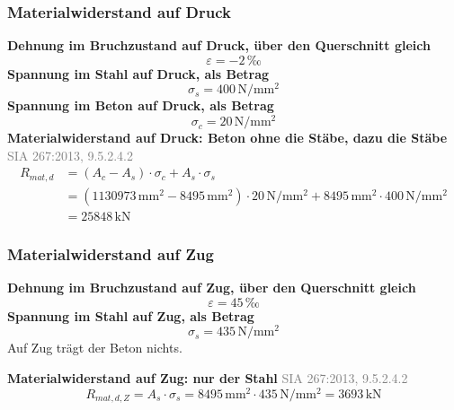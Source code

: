 \documentclass[11pt,a4paper]{article}
\newcommand{\normref}[1]{{\small\textcolor{gray}{#1}}}
\begin{document}
\subsubsection{Materialwiderstand auf Druck}
\noindent\textbf{Dehnung im Bruchzustand auf Druck, über den Querschnitt gleich}
\begin{equation*}
\varepsilon = -2\,\text{‰}
\end{equation*}
\noindent\textbf{Spannung im Stahl auf Druck, als Betrag}
\begin{equation*}
\sigma_s = 400\,\mathrm{N}/\mathrm{mm}^{2}
\end{equation*}
\noindent\textbf{Spannung im Beton auf Druck, als Betrag}
\begin{equation*}
\sigma_c = 20\,\mathrm{N}/\mathrm{mm}^{2}
\end{equation*}
\noindent\textbf{Materialwiderstand auf Druck: Beton ohne die Stäbe, dazu die Stäbe} \hfill \normref{SIA 267:2013, 9.5.2.4.2}
\begin{equation*}
\begin{aligned}
  R_{mat,d} &= \left(A_c - A_s\right) \cdot \sigma_c + A_s \cdot \sigma_s \\
  &= \left(1130973\,\mathrm{mm}^{2} - 8495\,\mathrm{mm}^{2}\right) \cdot 20\,\mathrm{N}/\mathrm{mm}^{2} + 8495\,\mathrm{mm}^{2} \cdot 400\,\mathrm{N}/\mathrm{mm}^{2} \\
  &= 25848\,\mathrm{kN}
\end{aligned}
\end{equation*}
\subsubsection{Materialwiderstand auf Zug}
\noindent\textbf{Dehnung im Bruchzustand auf Zug, über den Querschnitt gleich}
\begin{equation*}
\varepsilon = 45\,\text{‰}
\end{equation*}
\noindent\textbf{Spannung im Stahl auf Zug, als Betrag}
\begin{equation*}
\sigma_s = 435\,\mathrm{N}/\mathrm{mm}^{2}
\end{equation*}
Auf Zug trägt der Beton nichts.

\noindent\textbf{Materialwiderstand auf Zug: nur der Stahl} \hfill \normref{SIA 267:2013, 9.5.2.4.2}
\begin{equation*}
R_{mat,d,Z} = A_s \cdot \sigma_s = 8495\,\mathrm{mm}^{2} \cdot 435\,\mathrm{N}/\mathrm{mm}^{2} = 3693\,\mathrm{kN}
\end{equation*}
\end{document}
